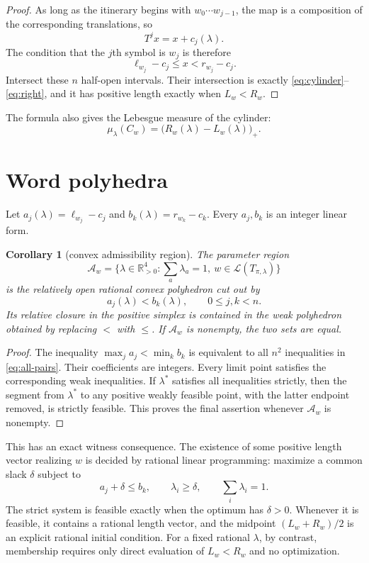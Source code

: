 \documentclass[11pt,a4paper]{amsart}
\newtheorem{corollary}[theorem]{Corollary}
\theoremstyle{definition}
\theoremstyle{remark}
\newcommand{\cL}{\mathcal L}
\newcommand{\cA}{\mathcal A}
\newcommand{\R}{\mathbb R}
\begin{document}
\begin{proof}
As long as the itinerary begins with $w_0\cdots w_{j-1}$, the map is a
composition of the corresponding translations, so
\[
 T^jx=x+c_j(\lambda).
\]
The condition that the $j$th symbol is $w_j$ is therefore
\[
 \ell_{w_j}-c_j\leq x<r_{w_j}-c_j.
\]
Intersect these $n$ half-open intervals.  Their intersection is exactly
\eqref{eq:cylinder}--\eqref{eq:right}, and it has positive length exactly when
$L_w<R_w$.
\end{proof}

The formula also gives the Lebesgue measure of the cylinder:
\begin{equation}\label{eq:measure}
 \mu_\lambda(C_w)=\bigl(R_w(\lambda)-L_w(\lambda)\bigr)_+.
\end{equation}

\section{Word polyhedra}

Let $a_j(\lambda)=\ell_{w_j}-c_j$ and
$b_k(\lambda)=r_{w_k}-c_k$.  Every $a_j,b_k$ is an integer linear form.

\begin{corollary}[convex admissibility region]\label{cor:polyhedron}
The parameter region
\[
 \cA_w=\{\lambda\in\R_{>0}^4:\textstyle\sum_a\lambda_a=1,
 \ w\in\cL(T_{\pi,\lambda})\}
\]
is the relatively open rational convex polyhedron cut out by
\begin{equation}\label{eq:all-pairs}
 a_j(\lambda)<b_k(\lambda),\qquad 0\leq j,k<n.
\end{equation}
Its relative closure in the positive simplex is contained in the weak
polyhedron obtained by replacing $<$ with $\leq$.  If $\cA_w$ is nonempty,
the two sets are equal.
\end{corollary}

\begin{proof}
The inequality $\max_j a_j<\min_k b_k$ is equivalent to all $n^2$
inequalities in \eqref{eq:all-pairs}.  Their coefficients are integers.
Every limit point satisfies the corresponding weak inequalities.  If
$\lambda^*$ satisfies all inequalities strictly, then the segment from
$\lambda^*$ to any positive weakly feasible point, with the latter endpoint
removed, is strictly feasible.  This proves the final assertion whenever
$\cA_w$ is nonempty.
\end{proof}

This has an exact witness consequence.  The existence of some positive length
vector realizing $w$ is decided by rational linear programming: maximize a
common slack $\delta$ subject to
\[
 a_j+\delta\leq b_k,\qquad \lambda_i\geq\delta,
 \qquad \sum_i\lambda_i=1.
\]
The strict system is feasible exactly when the optimum has $\delta>0$.
Whenever it is feasible, it contains a rational length vector, and the
midpoint $(L_w+R_w)/2$ is an explicit rational initial condition.  For a
fixed rational $\lambda$, by contrast, membership requires only direct
evaluation of $L_w<R_w$ and no optimization.
\end{document}

